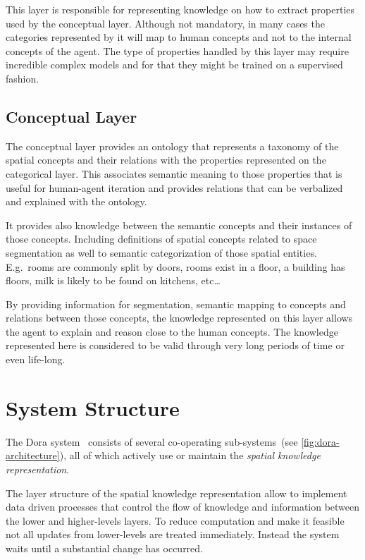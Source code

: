 This layer is responsible for representing knowledge on how to extract properties used
by the conceptual layer.
Although not mandatory, in many cases the categories represented by it will map to human concepts
and not to the internal concepts of the agent.
The type of properties handled by this layer may require incredible complex models and for
that they might be trained on a supervised fashion.

\subsection{Conceptual Layer}
The conceptual layer provides an ontology that represents a taxonomy of the spatial concepts
and their relations with the properties represented on the categorical layer.
This associates semantic meaning to those properties that is useful for human-agent iteration
and provides relations that can be verbalized and explained with the ontology.

It provides also knowledge between the semantic concepts and their instances of those concepts.
Including definitions of spatial concepts related to space segmentation as well to semantic
categorization of those spatial entities.
E.g.\ rooms are commonly split by doors, rooms exist in a floor, a building has floors, milk is
likely to be found on kitchens, etc\dots

By providing information for segmentation, semantic mapping to concepts and relations between those
concepts, the knowledge represented on this layer allows the agent to explain and reason close to
the human concepts. The knowledge represented here is considered to be valid through very long
periods of time or even life\hyp{}long.


\section{System Structure}
The \Gls{Dora} system~\cite{hanheide2011ijcai} consists of several co-operating
sub-systems~(see \autoref{fig:dora-architecture}),
all of which actively use or maintain the \emph{spatial knowledge representation}.

The layer structure of the spatial knowledge representation allow to implement
data driven processes that control the flow of knowledge and information between the
lower and higher\hyp{}levels layers. To reduce computation and make it feasible not
all updates from lower\hyp{}levels are treated immediately. Instead the system waits
until a substantial change has occurred.

